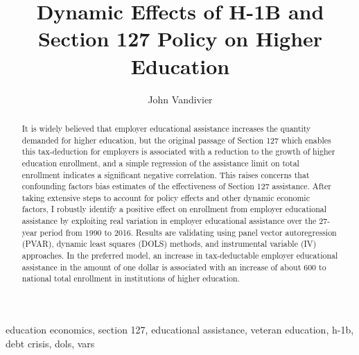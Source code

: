 \documentclass[review]{elsarticle}
\begin{document}
\begin{frontmatter}

\title{
    Dynamic Effects of H-1B and Section 127 Policy on Higher Education
}

\author[mymainaddress]{John Vandivier} %
\address[mymainaddress]{4400 University Dr, Fairfax, VA 22030}

\begin{abstract}
    It is widely believed that employer educational assistance increases the quantity demanded for higher education,
    but the original passage of Section 127 which enables this tax-deduction for employers is associated with a reduction to the growth of higher education enrollment,
    and a simple regression of the assistance limit on total enrollment indicates a significant negative correlation. %
    This raises concerns that confounding factors bias estimates of the effectiveness of Section 127 assistance.
    After taking extensive steps to account for policy effects and other dynamic economic factors,
    I robustly identify a positive effect on enrollment from employer educational assistance
    by exploiting real variation in employer educational assistance over the 27-year period from 1990 to 2016.
    Results are validating using panel vector autoregression (PVAR),
    dynamic least squares (DOLS) methods,
    and instrumental variable (IV) approaches.
    In the preferred model,
    an increase in tax-deductable employer educational assistance
    in the amount of one dollar is associated with
    an increase of about 600 to national total enrollment in institutions of higher education.
\end{abstract}

\begin{keyword}
education economics, section 127, educational assistance, veteran education, h-1b, debt crisis, dols, vars
\MSC[2010] %
\end{keyword}
\end{frontmatter}
\end{document}
